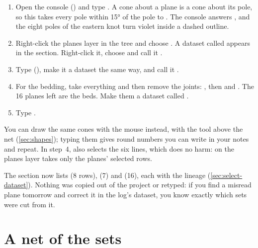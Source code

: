 \begin{tryit}
\begin{enumerate}
\item Open the console () and type . A cone about a plane is a cone
about its pole, so this takes every pole within 15° of the pole to . The console answers
, and the eight poles of the eastern knot turn violet inside a dashed outline.
\item Right-click the planes layer in the tree and choose . A dataset called
 appears in the  section. Right-click it, choose
 and call it .
\item Type  (), make it a dataset the same way, and
call it .
\item For the bedding, take everything and then remove the joints: , then
 and . The 16 planes left are the beds.
Make them a dataset called .
\item Type .
\end{enumerate}
\end{tryit}


You can draw the same cones with the mouse instead, with the  tool above the net
(\cref{sec:shapes}); typing them gives round numbers you can write in your notes and repeat. In step~4,
 also selects the six lines, which does no harm:  on the
planes layer takes only the planes' selected rows.

The  section now lists  (8 rows),  (7) and  (16), each with
the lineage  (\cref{sec:select-dataset}). Nothing
was copied out of the project or retyped: if you find a misread plane tomorrow and correct it in the
log's dataset, you know exactly which sets were cut from it.

\section{A net of the sets}\label{sec:wf-sets}

